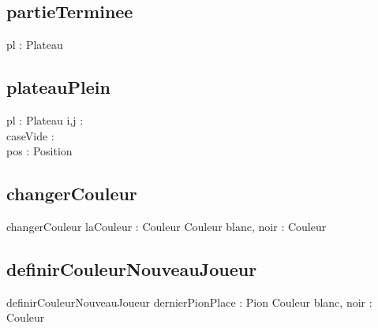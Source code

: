     \subsection{partieTerminee}
        \begin{algorithme}
                {pl : Plateau}
                {\booleen}
                {}
                {}
        \end{algorithme}
   
    \subsection{plateauPlein}
        \begin{algorithme}
                {pl : Plateau}
                {\booleen}
                {i,j : \naturelNonNul \\ caseVide : \booleen \\ pos : Position}
                {
                    {
                        {
                            {
                            }
                        }
                    }
                }
        \end{algorithme}
        
        
     	\subsection{changerCouleur}
     \begin{algorithme}
     	\fonction
     	{changerCouleur}
     	{laCouleur : Couleur}
     	{Couleur}
     	{blanc, noir : Couleur}
     	{
     		{
     		}
     		{
     		}
     	}
     \end{algorithme}
     \subsection{definirCouleurNouveauJoueur}
     \begin{algorithme}
     	\fonction
     	{definirCouleurNouveauJoueur}
     	{dernierPionPlace : Pion}
     	{Couleur}
     	{blanc, noir : Couleur}
     	{
     	}
     \end{algorithme}
     
